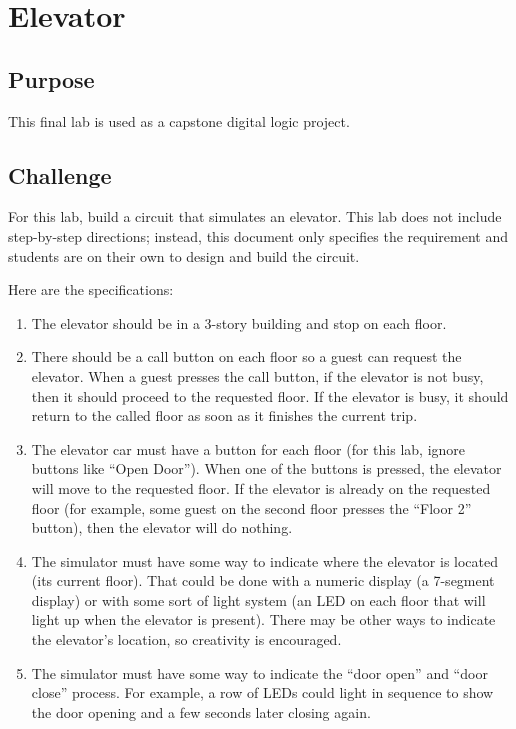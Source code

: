 \chapter{Elevator}\label{elev}

\section{Purpose}

This final lab is used as a capstone digital logic project. 

\section{Challenge}

For this lab, build a circuit that simulates an elevator. This lab does not include step-by-step directions; instead, this document only specifies the requirement and students are on their own to design and build the circuit.

Here are the specifications:

\begin{enumerate}
	\item The elevator should be in a 3-story building and stop on each floor.
	\item There should be a call button on each floor so a guest can request the elevator. When a guest presses the call button, if the elevator is not busy, then it should proceed to the requested floor. If the elevator is busy, it should return to the called floor as soon as it finishes the current trip.
	\item The elevator car must have a button for each floor (for this lab, ignore buttons like ``Open Door''). When one of the buttons is pressed, the elevator will move to the requested floor. If the elevator is already on the requested floor (for example, some guest on the second floor presses the ``Floor 2'' button), then the elevator will do nothing.
	\item The simulator must have some way to indicate where the elevator is located (its current floor). That could be done with a numeric display (a 7-segment display) or with some sort of light system (an LED on each floor that will light up when the elevator is present). There may be other ways to indicate the elevator's location, so creativity is encouraged.
	\item The simulator must have some way to indicate the ``door open'' and ``door close'' process. For example, a row of LEDs could light in sequence to show the door opening and a few seconds later closing again.
\end{enumerate}

